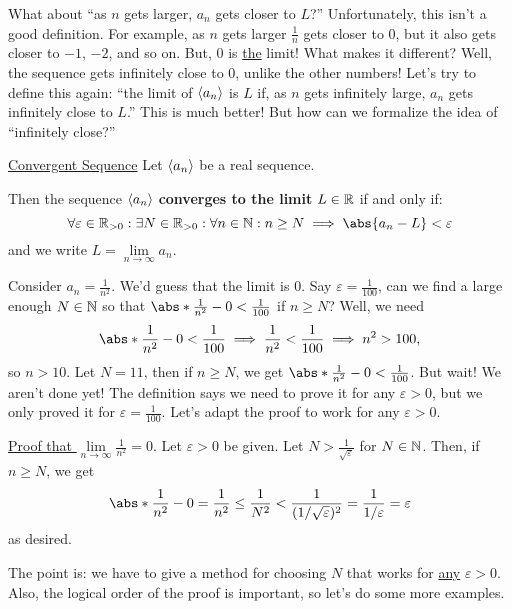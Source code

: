 What about ``as $ n $ gets larger, $ a_n $ gets closer to $ L $?'' Unfortunately, this isn't a good definition. For example, as $ n $
gets larger $ \frac{1}{n} $ gets closer to $ 0 $, but it also gets closer to $ -1 $, $ -2 $, and so on. But, $ 0 $
is \underline{the} limit! What makes it different? Well, the sequence gets infinitely close to $ 0 $,
unlike the other numbers! Let's try to define this again: ``the limit of $ \langle a_n\rangle $ is $ L $
if, as $ n $ gets infinitely large, $ a_n $ gets infinitely close to $ L $.'' This is much better!
But how can we formalize the idea of ``infinitely close?''
\begin{Definition}{\href{https://proofwiki.org/wiki/Definition:Convergent_Sequence/Real_Numbers}{Convergent Sequence}}{}
    Let $ \langle a_n\rangle $ be a real sequence.\bigskip

    Then the sequence $ \langle a_n\rangle $ \textbf{converges to the limit} $ L\in\mathbb{R}$ if and only if:
    \[ \forall \varepsilon\in\R_{>0}: \exists N\in \R_{>0}:\forall n\in\N:n\ge N\implies \abs{a_n-L}<\varepsilon \]
    and we write $ L=\lim\limits_{{n} \to {\infty}}a_n $.
\end{Definition}
\begin{Example}{}{}
    Consider $ a_n=\frac{1}{n^2} $. We'd guess that the limit is $ 0 $. Say $ \varepsilon=\frac{1}{100} $, can we find a large enough $ N\in \mathbb{N} $
    so that $ \abs*{\frac{1}{n^2}-0}<\frac{1}{100}  $ if $ n\ge N $? Well, we need
    \[ \abs*{\frac{1}{n^2}-0}<\frac{1}{100}\implies \frac{1}{n^2}<\frac{1}{100}\implies n^2>100, \]
    so $ n>10 $. Let $ N=11 $, then if $ n\ge N $, we get
    $ \abs*{\frac{1}{n^2}-0}<\frac{1}{100} $. But wait! We aren't done yet! The definition says we need to prove it for any $ \varepsilon>0 $,
    but we only proved it for $ \varepsilon=\frac{1}{100} $. Let's adapt the proof to work for any $ \varepsilon>0 $.
\end{Example}
\underline{Proof that $ \lim\limits_{{n} \to {\infty}}\frac{1}{n^2}=0 $}.
Let $ \varepsilon>0 $ be given. Let $ N>\frac{1}{\sqrt{\varepsilon}} $ for $ N\in \mathbb{N} $. Then, if $ n\ge N $,
we get
\[ \abs*{\frac{1}{n^2}-0}=\frac{1}{n^2}\le \frac{1}{N^2}<\frac{1}{(1/\sqrt{\varepsilon})^2}=\frac{1}{1/\varepsilon}=\varepsilon \]
as desired.

The point is: we have to give a method for choosing $ N $ that works for \underline{any} $ \varepsilon>0 $. Also, the logical order of the
proof is important, so let's do some more examples.

